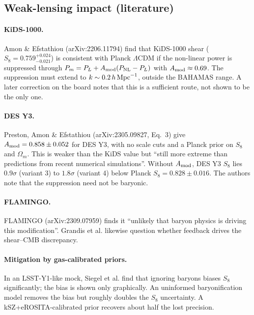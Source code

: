 \documentclass[11pt,a4paper]{article}
\begin{document}
\subsection{Weak-lensing impact (literature)}
\paragraph{KiDS-1000.} Amon \& Efstathiou (arXiv:2206.11794) find that KiDS-1000 shear ($S_8=0.759^{+0.024}_{-0.021}$) is consistent with Planck $\Lambda$CDM if the non-linear power is suppressed through $P_m=P_L+A_{\rm mod}(P_{\rm NL}-P_L)$ with $A_{\rm mod}\approx0.69$. The suppression must extend to $k\sim0.2\,h\,{\rm Mpc}^{-1}$, outside the BAHAMAS range. A later correction on the board notes that this is a sufficient route, not shown to be the only one.

\paragraph{DES Y3.} Preston, Amon \& Efstathiou (arXiv:2305.09827, Eq.~3) give $A_{\rm mod}=0.858\pm0.052$ for DES Y3, with no scale cuts and a Planck prior on $S_8$ and $\Omega_m$. This is weaker than the KiDS value but ``still more extreme than predictions from recent numerical simulations''. Without $A_{\rm mod}$, DES Y3 $S_8$ lies $0.9\sigma$ (variant 3) to $1.8\sigma$ (variant 4) below Planck $S_8=0.828\pm0.016$. The authors note that the suppression need not be baryonic.

\paragraph{FLAMINGO.} FLAMINGO (arXiv:2309.07959) finds it ``unlikely that baryon physics is driving this modification''. Grandis et al. likewise question whether feedback drives the shear--CMB discrepancy.

\paragraph{Mitigation by gas-calibrated priors.} In an LSST-Y1-like mock, Siegel et al. find that ignoring baryons biases $S_8$ significantly; the bias is shown only graphically. An uninformed baryonification model removes the bias but roughly doubles the $S_8$ uncertainty. A kSZ+eROSITA-calibrated prior recovers about half the lost precision.
\end{document}
